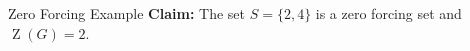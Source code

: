 \documentclass[final]{beamer}
\newcommand{\Z}{\operatorname{Z}}
\newcommand{\A}{\mathcal{A}}
\newcommand{\B}{\mathcal{B}}
\newcommand{\x}{\times}
\newcommand{\bit}{\begin{itemize}}
\newcommand{\eit}{\end{itemize}}
\newcommand{\ben}{\begin{enumerate}}
\newcommand{\een}{\end{enumerate}}
\def\mtx#1{\begin{bmatrix} #1 \end{bmatrix}}
\begin{document}
\begin{frame}{}
\begin{columns}[t]
\begin{column}{0.23\linewidth}
\begin{block}{Zero Forcing Example}
\textbf{Claim:} The set $S = \{2,4\}$ is a zero forcing set and $\Z(G) = 2$.
\begin{figure}[h!]
\centering
{}
\end{figure}

\end{block}


\end{column}%

\begin{column}{0.38\linewidth}
 

\end{column}
\end{columns}
\end{frame}
\end{document}
